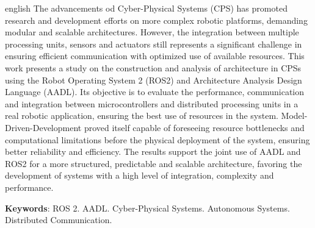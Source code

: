 \begin{resumo}[Abstract]
\begin{otherlanguage*}{english}
The advancements od Cyber-Physical Systems (CPS) has promoted research and development efforts on more complex robotic platforms, demanding modular and scalable architectures. However, the integration between multiple processing units, sensors and actuators still represents a significant challenge in ensuring efficient communication with optimized use of available resources.
This work presents a study on the construction and analysis of architecture in CPSs  using the Robot Operating System 2 (ROS2) and Architecture Analysis Design Language (AADL). Its objective is to evaluate the performance, communication and integration between microcontrollers and distributed processing units in a real robotic application, ensuring the best use of resources in the system.
Model-Driven-Development proved itself capable of foreseeing resource bottlenecks and computational limitations before the physical deployment of the system, ensuring better reliability and efficiency. The results support the joint use of AADL and ROS2 for a more structured, predictable and scalable architecture, favoring the development of systems with a high level of integration, complexity and performance. 
    
\textbf{Keywords}: ROS 2. AADL. Cyber-Physical Systems. Autonomous Systems. Distributed Communication.
\end{otherlanguage*}
\end{resumo}